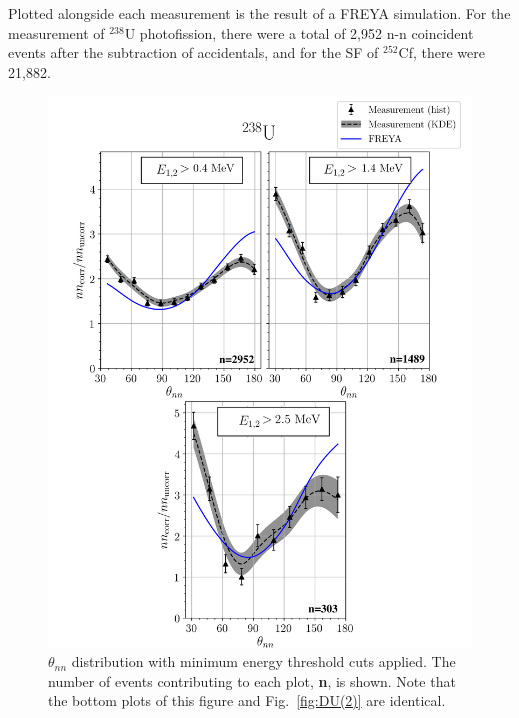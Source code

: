 Plotted alongside each measurement is the result of a FREYA simulation.
For the measurement of $^{238}$U photofission, there were a total of 2,952 n-n coincident events after the subtraction of accidentals, and for the SF of $^{252}$Cf, there were  21,882.
\FloatBarrier
\begin{figure}
\centering
    \includegraphics[width = \figsize\textwidth]{FinalDUResultw_freya0(fix)KDE.png}
    \caption{$\theta_{nn}$ distribution with minimum energy threshold cuts applied.
    The number of events contributing to each plot, \textbf{n}, is shown. Note that the bottom plots of this figure and Fig.~\ref{fig:DU(2)} are identical.}
    \label{fig:DU(0)}
\end{figure}
